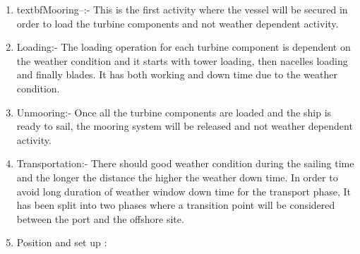 \begin{enumerate}
\item 
textbf{Mooring--}:- This is the first activity where the vessel will be secured in order to load the turbine components and not weather dependent activity.
\item Loading:- The loading operation for each turbine component is dependent on the weather condition and it starts with tower loading, then nacelles loading and finally blades. It has both working and down time due to the weather condition.
\item Unmooring:- Once all the turbine components are loaded and the ship is ready to sail, the mooring system will be released and not weather dependent activity.
\item Transportation:- There should good weather condition during the sailing time and the longer the distance the higher the weather down time. In order to avoid long duration of weather window down time  for the transport phase, It has been split into two phases where a transition point will be considered between the port and the offshore site.
\item Position and set up : 
\end{enumerate}